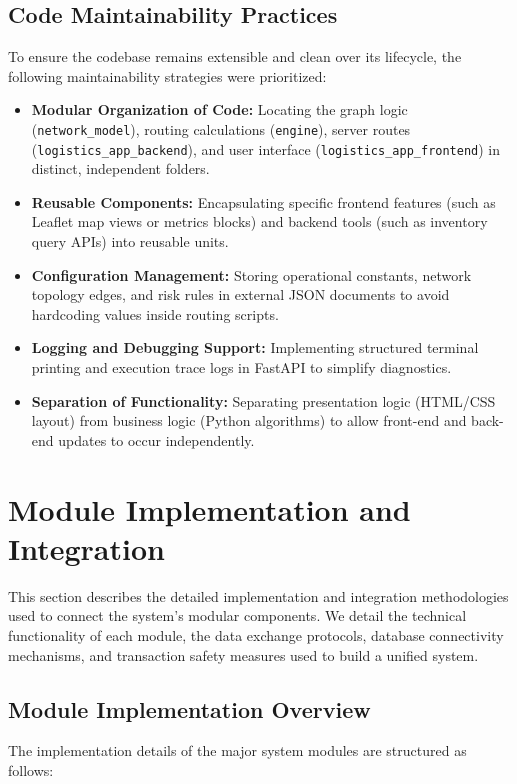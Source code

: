 \subsection[Code Maintainability Practices]{Code Maintainability Practices}
To ensure the codebase remains extensible and clean over its lifecycle, the following maintainability strategies were prioritized:

\begin{itemize}
    \item \textbf{Modular Organization of Code:} Locating the graph logic (\texttt{network\_model}), routing calculations (\texttt{engine}), server routes (\texttt{logistics\_app\_backend}), and user interface (\texttt{logistics\_app\_frontend}) in distinct, independent folders.
    \item \textbf{Reusable Components:} Encapsulating specific frontend features (such as Leaflet map views or metrics blocks) and backend tools (such as inventory query APIs) into reusable units.
    \item \textbf{Configuration Management:} Storing operational constants, network topology edges, and risk rules in external JSON documents to avoid hardcoding values inside routing scripts.
    \item \textbf{Logging and Debugging Support:} Implementing structured terminal printing and execution trace logs in FastAPI to simplify diagnostics.
    \item \textbf{Separation of Functionality:} Separating presentation logic (HTML/CSS layout) from business logic (Python algorithms) to allow front-end and back-end updates to occur independently.
\end{itemize}
\section[Module Implementation and Integration]{Module Implementation and Integration}
This section describes the detailed implementation and integration methodologies used to connect the system's modular components. We detail the technical functionality of each module, the data exchange protocols, database connectivity mechanisms, and transaction safety measures used to build a unified system.

\subsection[Module Implementation Overview]{Module Implementation Overview}
The implementation details of the major system modules are structured as follows:

